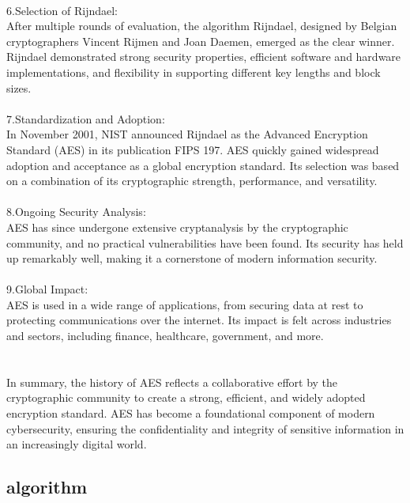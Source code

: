\documentclass{report}
\begin{document}
\\
6.Selection of Rijndael:\\
After multiple rounds of evaluation, the algorithm Rijndael, designed by Belgian cryptographers Vincent Rijmen and Joan Daemen, emerged as the clear winner. Rijndael demonstrated strong security properties, efficient software and hardware implementations, and flexibility in supporting different key lengths and block sizes.\\
\\
7.Standardization and Adoption:\\
In November 2001, NIST announced Rijndael as the Advanced Encryption Standard (AES) in its publication FIPS 197. AES quickly gained widespread adoption and acceptance as a global encryption standard. Its selection was based on a combination of its cryptographic strength, performance, and versatility.\\
\\
8.Ongoing Security Analysis:\\
AES has since undergone extensive cryptanalysis by the cryptographic community, and no practical vulnerabilities have been found. Its security has held up remarkably well, making it a cornerstone of modern information security.\\
\\
9.Global Impact:\\
AES is used in a wide range of applications, from securing data at rest to protecting communications over the internet. Its impact is felt across industries and sectors, including finance, healthcare, government, and more.\\
\\
\\
In summary, the history of AES reflects a collaborative effort by the cryptographic community to create a strong, efficient, and widely adopted encryption standard. AES has become a foundational component of modern cybersecurity, ensuring the confidentiality and integrity of sensitive information in an increasingly digital world.

\subsection{algorithm}
\end{document}

